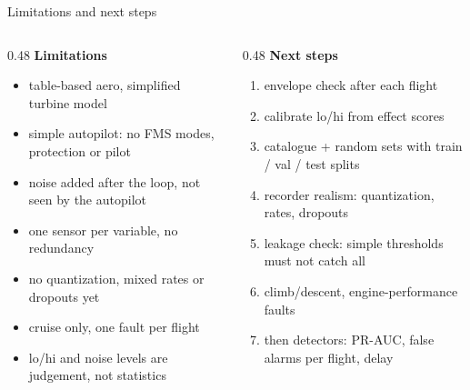 \documentclass[aspectratio=169,11pt]{beamer}
\begin{document}
\begin{frame}{Limitations and next steps}
  \begin{columns}[T]
    \begin{column}{0.48\textwidth}
      \textbf{Limitations}
      \begin{itemize}\footnotesize\setlength\itemsep{0.3em}
        \item table-based aero, simplified turbine model
        \item simple autopilot: no FMS modes, protection or pilot
        \item noise added after the loop, not seen by the autopilot
        \item one sensor per variable, no redundancy
        \item no quantization, mixed rates or dropouts yet
        \item cruise only, one fault per flight
        \item lo/hi and noise levels are judgement, not statistics
      \end{itemize}
    \end{column}
    \begin{column}{0.48\textwidth}
      \textbf{Next steps}
      \begin{enumerate}\footnotesize\setlength\itemsep{0.3em}
        \item envelope check after each flight
        \item calibrate lo/hi from effect scores
        \item catalogue + random sets with train / val / test splits
        \item recorder realism: quantization, rates, dropouts
        \item leakage check: simple thresholds must not catch all
        \item climb/descent, engine-performance faults
        \item then detectors: PR-AUC, false alarms per flight, delay
      \end{enumerate}
    \end{column}
  \end{columns}
\end{frame}
\end{document}
